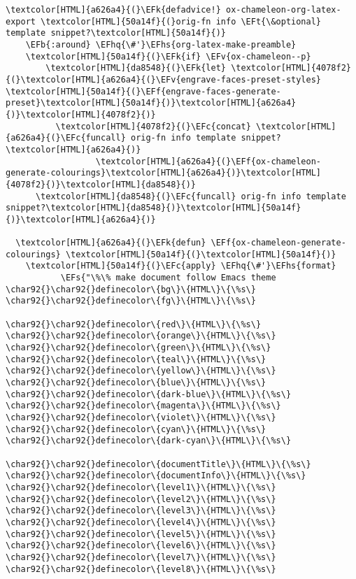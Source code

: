 \documentclass{scrartcl}
\newcommand{\EFk}[1]{\textcolor{EFk}{#1}} %
\newcommand{\EFt}[1]{\textcolor{EFt}{#1}} %
\newcommand{\EFs}[1]{\textcolor{EFs}{#1}} %
\newcommand{\EFb}[1]{\textcolor{EFb}{#1}} %
\newcommand{\EFc}[1]{\textcolor{EFc}{#1}} %
\newcommand{\EFv}[1]{\textcolor{EFv}{#1}} %
\newcommand{\EFf}[1]{\textcolor{EFf}{#1}} %
\newcommand{\EFhq}[1]{\textcolor{EFhq}{#1}} %
\newcommand{\EFhs}[1]{\textcolor{EFhs}{#1}} %
\begin{document}
\begin{enumerate}
\begin{Code}
\begin{Verbatim}[]
  \textcolor[HTML]{a626a4}{(}\EFk{defadvice!} ox-chameleon-org-latex-export \textcolor[HTML]{50a14f}{(}orig-fn info \EFt{\&optional} template snippet?\textcolor[HTML]{50a14f}{)}
    \EFb{:around} \EFhq{\#'}\EFhs{org-latex-make-preamble}
    \textcolor[HTML]{50a14f}{(}\EFk{if} \EFv{ox-chameleon--p}
        \textcolor[HTML]{da8548}{(}\EFk{let} \textcolor[HTML]{4078f2}{(}\textcolor[HTML]{a626a4}{(}\EFv{engrave-faces-preset-styles} \textcolor[HTML]{50a14f}{(}\EFf{engrave-faces-generate-preset}\textcolor[HTML]{50a14f}{)}\textcolor[HTML]{a626a4}{)}\textcolor[HTML]{4078f2}{)}
          \textcolor[HTML]{4078f2}{(}\EFc{concat} \textcolor[HTML]{a626a4}{(}\EFc{funcall} orig-fn info template snippet?\textcolor[HTML]{a626a4}{)}
                  \textcolor[HTML]{a626a4}{(}\EFf{ox-chameleon-generate-colourings}\textcolor[HTML]{a626a4}{)}\textcolor[HTML]{4078f2}{)}\textcolor[HTML]{da8548}{)}
      \textcolor[HTML]{da8548}{(}\EFc{funcall} orig-fn info template snippet?\textcolor[HTML]{da8548}{)}\textcolor[HTML]{50a14f}{)}\textcolor[HTML]{a626a4}{)}

  \textcolor[HTML]{a626a4}{(}\EFk{defun} \EFf{ox-chameleon-generate-colourings} \textcolor[HTML]{50a14f}{(}\textcolor[HTML]{50a14f}{)}
    \textcolor[HTML]{50a14f}{(}\EFc{apply} \EFhq{\#'}\EFhs{format}
           \EFs{"\%\% make document follow Emacs theme
\char92{}\char92{}definecolor\{bg\}\{HTML\}\{\%s\}
\char92{}\char92{}definecolor\{fg\}\{HTML\}\{\%s\}

\char92{}\char92{}definecolor\{red\}\{HTML\}\{\%s\}
\char92{}\char92{}definecolor\{orange\}\{HTML\}\{\%s\}
\char92{}\char92{}definecolor\{green\}\{HTML\}\{\%s\}
\char92{}\char92{}definecolor\{teal\}\{HTML\}\{\%s\}
\char92{}\char92{}definecolor\{yellow\}\{HTML\}\{\%s\}
\char92{}\char92{}definecolor\{blue\}\{HTML\}\{\%s\}
\char92{}\char92{}definecolor\{dark-blue\}\{HTML\}\{\%s\}
\char92{}\char92{}definecolor\{magenta\}\{HTML\}\{\%s\}
\char92{}\char92{}definecolor\{violet\}\{HTML\}\{\%s\}
\char92{}\char92{}definecolor\{cyan\}\{HTML\}\{\%s\}
\char92{}\char92{}definecolor\{dark-cyan\}\{HTML\}\{\%s\}

\char92{}\char92{}definecolor\{documentTitle\}\{HTML\}\{\%s\}
\char92{}\char92{}definecolor\{documentInfo\}\{HTML\}\{\%s\}
\char92{}\char92{}definecolor\{level1\}\{HTML\}\{\%s\}
\char92{}\char92{}definecolor\{level2\}\{HTML\}\{\%s\}
\char92{}\char92{}definecolor\{level3\}\{HTML\}\{\%s\}
\char92{}\char92{}definecolor\{level4\}\{HTML\}\{\%s\}
\char92{}\char92{}definecolor\{level5\}\{HTML\}\{\%s\}
\char92{}\char92{}definecolor\{level6\}\{HTML\}\{\%s\}
\char92{}\char92{}definecolor\{level7\}\{HTML\}\{\%s\}
\char92{}\char92{}definecolor\{level8\}\{HTML\}\{\%s\}


\end{Verbatim}
\end{Code}
\end{enumerate}
\end{document}
